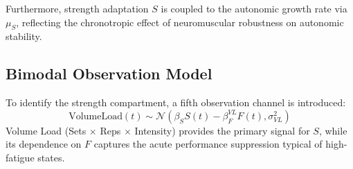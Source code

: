 Furthermore, strength adaptation $S$ is coupled to the autonomic growth rate via $\mu_S$, reflecting the chronotropic effect of neuromuscular robustness on autonomic stability.

\subsection{Bimodal Observation Model}

To identify the strength compartment, a fifth observation channel is introduced:
\begin{equation}
    \mathrm{VolumeLoad}(t) \sim \mathcal{N}(\beta_S S(t) - \beta_F^{VL} F(t), \sigma_{VL}^2)
\end{equation}
Volume Load (Sets $\times$ Reps $\times$ Intensity) provides the primary signal for $S$, while its dependence on $F$ captures the acute performance suppression typical of high-fatigue states.
